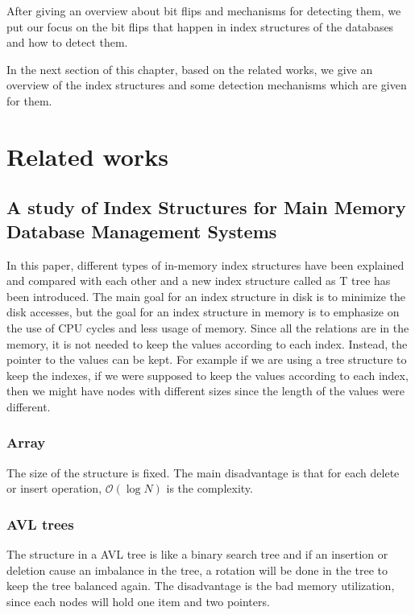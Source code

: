 \documentclass{report}
\begin{document}
After giving an overview about bit flips and mechanisms for detecting them, we put our focus on the bit flips that happen in index structures of the databases and how to detect them.
 
In the next section of this chapter, based on the related works, we give an overview of the index structures and some detection mechanisms which are given for them. 

\section{Related works}

\subsection{A study of Index Structures for Main Memory Database Management Systems  \cite{leca} }

In this paper, different types of in-memory index structures have been explained and compared with each other and a new index structure called as T tree has been introduced.
The main goal for an index structure in disk is to minimize the disk accesses, but the goal for an index structure in memory is to emphasize on the use of CPU cycles and less usage of memory. Since all the relations are in the memory, it is not needed to keep the values according to each index. Instead, the pointer to the values can be kept. For example if we are using a tree structure to keep the indexes, if we were supposed to keep the values according to each index, then we might have nodes with different sizes since the length of the values were different.
\subsubsection{Array}

The size of the structure is fixed. The main disadvantage is that for each delete or insert operation, $\mathcal{O}(\log{}N)$ is the complexity.

\subsubsection{AVL trees}

The structure in a AVL tree is like a binary search tree and if an insertion or deletion cause an imbalance in the tree, a rotation will be done in the tree to keep the tree balanced again. The disadvantage is the bad memory utilization, since each nodes will hold one item and two pointers.
 
\end{document}
